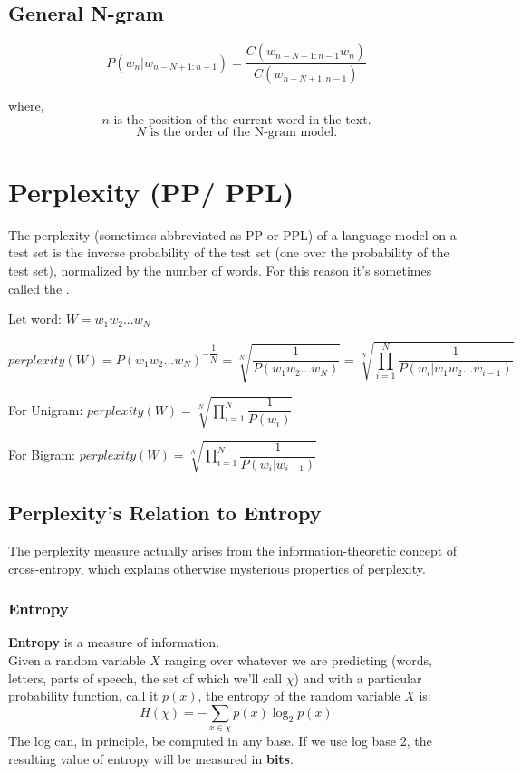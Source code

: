 \subsection{General N-gram \cite{nlp-1}}

\[
    P(w_n|w_{n-N+1:n-1}) = \displaystyle\dfrac{C(w_{n-N+1:n-1} w_n)}{C(w_{n-N+1:n-1})}
\]

where,
\[
    n \text{ is the position of the current word in the text.}
\]
\[
    N \text{ is the order of the N-gram model.}
\]


\section{Perplexity (PP/ PPL) \cite{nlp-1}}

The perplexity (sometimes abbreviated as PP or PPL) of a language model on a test set is the inverse probability of the test set (one over the probability of the test set), normalized by the number of words. For this reason it’s sometimes called the .

Let word: \(W = w_1w_2 ...w_N\)

\[
    perplexity(W) = P(w_1w_2 ...w_N)^{-\displaystyle\dfrac{1}{N}} = \sqrt[N]{\displaystyle\dfrac{1}{P(w_1w_2 ...w_N)}} = \sqrt[N]{\prod_{i=1}^{N} \displaystyle\dfrac{1}{P(w_i|w_1w_2 ...w_{i-1})}}
\]

For Unigram:
\(
   \displaystyle perplexity(W) = \sqrt[N]{\prod_{i=1}^{N} \displaystyle\dfrac{1}{P(w_i)}}
\)

\vspace{0.2cm}

For Bigram:
\(
   \displaystyle perplexity(W) = \sqrt[N]{\prod_{i=1}^{N} \displaystyle\dfrac{1}{P(w_i|w_{i-1})}}
\)

\subsection{Perplexity’s Relation to Entropy}
The perplexity measure actually arises from the information-theoretic concept of cross-entropy, which explains otherwise mysterious properties of perplexity.

\subsubsection{Entropy}\label{Entropy}
\textbf{Entropy} is a measure of information.\\
Given a random variable $X$ ranging over whatever we are predicting (words, letters, parts of speech, the set of which we’ll call $\chi$) and with a particular probability function, call it $p(x)$, the entropy of the random variable $X$ is:
\[
    \displaystyle H(\chi) = - \sum_{x \in \chi} p(x)\log_2p(x)
\]
The log can, in principle, be computed in any base. If we use log base 2, the
resulting value of entropy will be measured in \textbf{bits}.

